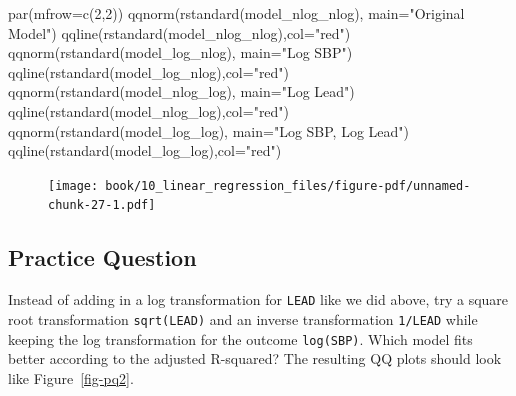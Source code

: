 \documentclass[
  letterpaper,
]{krantz}
\makeatletter
\newenvironment{Shaded}{\begin{snugshade}}{\end{snugshade}}
\newcommand{\AttributeTok}[1]{\textcolor[rgb]{0.40,0.45,0.13}{#1}}
\newcommand{\DecValTok}[1]{\textcolor[rgb]{0.68,0.00,0.00}{#1}}
\newcommand{\FunctionTok}[1]{\textcolor[rgb]{0.28,0.35,0.67}{#1}}
\newcommand{\NormalTok}[1]{\textcolor[rgb]{0.00,0.23,0.31}{#1}}
\newcommand{\StringTok}[1]{\textcolor[rgb]{0.13,0.47,0.30}{#1}}
\newenvironment{kframe}{%
\medskip{}
\setlength{\fboxsep}{.8em}
 \def\at@end@of@kframe{}%
 \ifinner\ifhmode%
  \def\at@end@of@kframe{\end{minipage}}%
  \begin{minipage}{\columnwidth}%
 \fi\fi%
 \def\FrameCommand##1{\hskip\@totalleftmargin \hskip-\fboxsep
 \colorbox{shadecolor}{##1}\hskip-\fboxsep
     \hskip-\linewidth \hskip-\@totalleftmargin \hskip\columnwidth}%
 \MakeFramed {\advance\hsize-\width
   \@totalleftmargin\z@ \linewidth\hsize
   \@setminipage}}%
 {\par\unskip\endMakeFramed%
 \at@end@of@kframe}
\renewenvironment{Shaded}{\begin{kframe}}{\end{kframe}}
\makeatother
\begin{document}
\begin{Shaded}
\begin{Highlighting}[]
\FunctionTok{par}\NormalTok{(}\AttributeTok{mfrow=}\FunctionTok{c}\NormalTok{(}\DecValTok{2}\NormalTok{,}\DecValTok{2}\NormalTok{))}
\FunctionTok{qqnorm}\NormalTok{(}\FunctionTok{rstandard}\NormalTok{(model\_nlog\_nlog), }\AttributeTok{main=}\StringTok{"Original Model"}\NormalTok{) }
\FunctionTok{qqline}\NormalTok{(}\FunctionTok{rstandard}\NormalTok{(model\_nlog\_nlog),}\AttributeTok{col=}\StringTok{"red"}\NormalTok{)}
\FunctionTok{qqnorm}\NormalTok{(}\FunctionTok{rstandard}\NormalTok{(model\_log\_nlog), }\AttributeTok{main=}\StringTok{"Log SBP"}\NormalTok{) }
\FunctionTok{qqline}\NormalTok{(}\FunctionTok{rstandard}\NormalTok{(model\_log\_nlog),}\AttributeTok{col=}\StringTok{"red"}\NormalTok{)}
\FunctionTok{qqnorm}\NormalTok{(}\FunctionTok{rstandard}\NormalTok{(model\_nlog\_log), }\AttributeTok{main=}\StringTok{"Log Lead"}\NormalTok{) }
\FunctionTok{qqline}\NormalTok{(}\FunctionTok{rstandard}\NormalTok{(model\_nlog\_log),}\AttributeTok{col=}\StringTok{"red"}\NormalTok{)}
\FunctionTok{qqnorm}\NormalTok{(}\FunctionTok{rstandard}\NormalTok{(model\_log\_log), }\AttributeTok{main=}\StringTok{"Log SBP, Log Lead"}\NormalTok{) }
\FunctionTok{qqline}\NormalTok{(}\FunctionTok{rstandard}\NormalTok{(model\_log\_log),}\AttributeTok{col=}\StringTok{"red"}\NormalTok{)}
\end{Highlighting}
\end{Shaded}

\begin{figure}[H]

{\centering \texttt{[image: book/10\_linear\_regression\_files/figure-pdf/unnamed-chunk-27-1.pdf]}

}

\end{figure}

\hypertarget{practice-question-22}{%
\subsection{Practice Question}\label{practice-question-22}}

Instead of adding in a log transformation for \texttt{LEAD} like we did
above, try a square root transformation \texttt{sqrt(LEAD)} and an
inverse transformation \texttt{1/LEAD} while keeping the log
transformation for the outcome \texttt{log(SBP)}. Which model fits
better according to the adjusted R-squared? The resulting QQ plots
should look like Figure~\ref{fig-pq2}.
\end{document}
